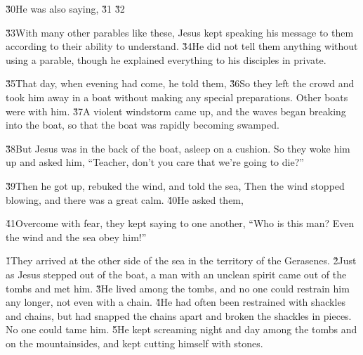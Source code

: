 \v{30}He was also saying,  \v{31}  \v{32}

\v{33}With many other parables like these, Jesus kept speaking his message to them according to their ability to understand. \v{34}He did not tell them anything without using a parable, though he explained everything to his disciples in private.

\v{35}That day, when evening had come, he told them,  \v{36}So they left the crowd and took him away in a boat without making any special preparations. Other boats were with him. \v{37}A violent windstorm came up, and the waves began breaking into the boat, so that the boat was rapidly becoming swamped.

\v{38}But Jesus was in the back of the boat, asleep on a cushion. So they woke him up and asked him, ``Teacher, don't you care that we're going to die?''

\v{39}Then he got up, rebuked the wind, and told the sea,  Then the wind stopped blowing, and there was a great calm. \v{40}He asked them, 

\v{41}Overcome with fear, they kept saying to one another, ``Who is this man? Even the wind and the sea obey him!''

\v{1}They arrived at the other side of the sea in the territory of the Gerasenes. \v{2}Just as Jesus stepped out of the boat, a man with an unclean spirit came out of the tombs and met him. \v{3}He lived among the tombs, and no one could restrain him any longer, not even with a chain. \v{4}He had often been restrained with shackles and chains, but had snapped the chains apart and broken the shackles in pieces. No one could tame him. \v{5}He kept screaming night and day among the tombs and on the mountainsides, and kept cutting himself with stones.

